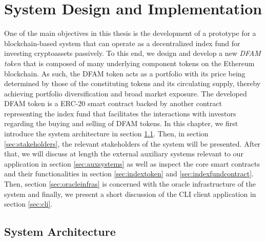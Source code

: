 \chapter{System Design and Implementation}\label{chapter:design_impl}

One of the main objectives in this thesis is the development of a prototype for a blockchain-based system that can operate as a decentralized index fund for investing cryptoassets passively. To this end, we design and develop a new \textit{DFAM token} that is composed of many underlying component tokens on the Ethereum blockchain. As such, the DFAM token acts as a portfolio with its price being determined by those of the constituting tokens and its circulating supply, thereby achieving portfolio diversification and broad market exposure. The developed DFAM token is a ERC-20 smart contract backed by another contract representing the index fund that facilitates the interactions with investors regarding the buying and selling of DFAM tokens. In this chapter, we first introduce the system architecture in section \ref{sec:sysarchitecture}. Then, in section \ref{sec:stakeholders}, the relevant stakeholders of the system will be presented. After that, we will discuss at length the external auxiliary systems relevant to our application in section \ref{sec:auxsystems} as well as inspect the core smart contracts and their functionalities in section \ref{sec:indextoken} and \ref{sec:indexfundcontract}. Then, section \ref{sec:oracleinfras} is concerned with the oracle infrastructure of the system and finally, we present a short discussion of the CLI client application in section \ref{sec:cli}.  

\section{System Architecture} \label{sec:sysarchitecture}

